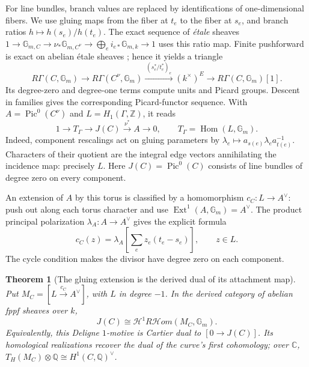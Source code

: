 \documentclass[11pt]{article}
\newtheorem{theorem}{Theorem}[section]
\theoremstyle{definition}
\theoremstyle{remark}
\newcommand{\Q}{\mathbb Q}
\newcommand{\Z}{\mathbb Z}
\newcommand{\C}{\mathbb C}
\begin{document}
For line bundles, branch values are replaced by identifications of
one-dimensional fibers. We use gluing maps from the fiber at $t_e$ to
the fiber at $s_e$, and branch ratios $h\mapsto h(s_e)/h(t_e)$.
The exact sequence of \emph{\'{e}tale} sheaves
$1\to\mathbb G_{m,C}\to\nu_*\mathbb G_{m,C^\nu}
\to\bigoplus_e i_{e*}\mathbb G_{m,k}\to1$ uses this ratio map.
Finite pushforward is exact on abelian \'{e}tale sheaves
\cite[Proposition 59.55.2]{StacksFiniteEtale}; hence it yields a triangle
\[
 R\Gamma(C,\mathbb G_m)\longrightarrow
 R\Gamma(C^\nu,\mathbb G_m)
 \xrightarrow{\ (s_e^*/t_e^*)_e\ }(k^\times)^E
 \longrightarrow R\Gamma(C,\mathbb G_m)[1].
\]
Its degree-zero and degree-one terms compute units and Picard groups.
Descent in families gives the corresponding Picard-functor sequence.
With $A=\operatorname{Pic}^0(C^\nu)$ and $L=H_1(\Gamma,\Z)$, it reads
\begin{equation}\label{eq:derived-picard-extension}
 1\longrightarrow T_\Gamma\longrightarrow J(C)
 \xrightarrow{\nu^*}A\longrightarrow0,
 \qquad T_\Gamma=\operatorname{Hom}(L,\mathbb G_m).
\end{equation}
Indeed, component rescalings act on gluing parameters by
$\lambda_e\mapsto a_{s(e)}\lambda_e a_{t(e)}^{-1}$. Characters of their
quotient are the integral edge vectors annihilating the incidence map:
precisely $L$. Here $J(C)=\operatorname{Pic}^0(C)$ consists of line bundles
of degree zero on every component.

An extension of $A$ by this torus is classified by a homomorphism
$c_C:L\to A^\vee$: push out along each torus character and use
$\operatorname{Ext}^1(A,\mathbb G_m)=A^\vee$. The product principal
polarization $\lambda_A:A\to A^\vee$ gives the explicit formula
\begin{equation}\label{eq:derived-attachment-map}
 c_C(z)=\lambda_A\left[\sum_e z_e(t_e-s_e)\right],\qquad z\in L.
\end{equation}
The cycle condition makes the divisor have degree zero on each component.

\begin{theorem}[The gluing extension is the derived dual of its attachment map]
\label{thm:derived-picard-duality}
Put $M_C=[L\xrightarrow{c_C}A^\vee]$, with $L$ in degree $-1$.
In the derived category of abelian fppf sheaves over $k$,
\begin{equation}\label{eq:derived-ext-jacobian}
 J(C)\cong\mathcal H^1R\mathcal Hom(M_C,\mathbb G_m).
\end{equation}
Equivalently, this Deligne $1$-motive is Cartier dual to $[0\to J(C)]$.
Its homological realizations recover the dual of the curve's first
cohomology; over $\C$,
$T_H(M_C)\otimes\Q\cong H^1(C,\Q)^\vee$.
\end{theorem}
\end{document}
